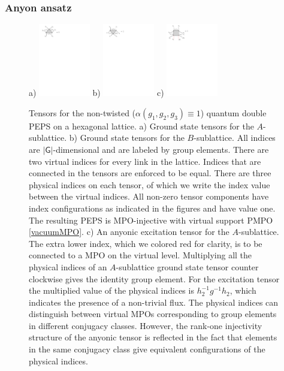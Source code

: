 \documentclass[12 pt]{article}
\begin{document}
\subsubsection{Anyon ansatz}

\begin{figure}
  \centering
   a)
    \includegraphics[width=0.2\textwidth]{QDtensor1}
   b)
    \includegraphics[width=0.2\textwidth]{QDtensor2}
    c)
    \includegraphics[width=0.2\textwidth]{QDtensor3}
\caption{Tensors for the non-twisted ($\alpha(g_1,g_2,g_3)\equiv 1$) quantum double PEPS on a hexagonal lattice. a) Ground state tensors for the $A$-sublattice.   b) Ground state tensors for the $B$-sublattice. All indices are $|\mathsf{G}|$-dimensional and are labeled by group elements. There are two virtual indices for every link in the lattice. Indices that are connected in the tensors are enforced to be equal. There are three physical indices on each tensor, of which we write the index value between the virtual indices. All non-zero tensor components have index configurations as indicated in the figures and have value one. The resulting PEPS is MPO-injective with virtual support PMPO \eqref{vacuumMPO}. c) An anyonic excitation tensor for the $A$-sublattice. The extra lower index, which we colored red for clarity, is to be connected to a MPO on the virtual level. Multiplying all the physical indices of an $A$-sublattice ground state tensor counter clockwise gives the identity group element. For the excitation tensor the multiplied value of the physical indices is $h_2^{-1}g^{-1}h_2$, which indicates the presence of a non-trivial flux. The physical indices can distinguish between virtual MPOs corresponding to group elements in different conjugacy classes. However,  the rank-one injectivity structure of the anyonic tensor is reflected in the fact that elements in the same conjugacy class give equivalent configurations of the physical indices.}
\label{fig:QDtensor}
\end{figure}
\end{document}
